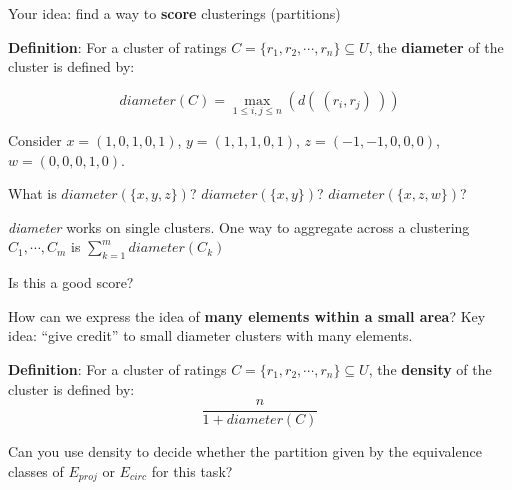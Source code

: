 Your idea: find a way to {\bf score} clusterings (partitions) 


{\bf Definition}: For a cluster of ratings $C = \{r_1, r_2, \cdots, r_n \} 
\subseteq U$, the {\bf diameter} of the cluster is defined by:

$$\textit{diameter}(C) = \max_{1 \leq i, j \leq n} (d(~(r_i, r_j)~))$$ 

Consider $x = (1, 0, 1, 0, 1)$, $y = (1, 1, 1, 0, 1)$, $z = (-1, -1, 0, 0, 0)$, $w = (0, 0, 0, 1, 0)$.

What is $\textit{diameter}(\{x, y, z\})$? $\textit{diameter}(\{x, y\})$? $\textit{diameter}(\{x, z, w\})$?

\vspace{100pt}

\textit{diameter} works on single clusters. One way to aggregate across a
clustering $C_1, \cdots, C_m$ is $\sum_{k=1}^m diameter(C_k)$


Is this a good score?

\vspace{100pt}

How can we express the idea of {\bf many elements within a small area}? Key idea: ``give credit'' to small diameter clusters with many elements.

{\bf Definition}: For a cluster of ratings $C = \{r_1, r_2, \cdots, r_n \} 
\subseteq U$, the {\bf density} of the cluster is defined by:
\[
    \frac{n}{1+ diameter(C)}
\]



\newpage

Can you use density to decide whether the partition given by 
the equivalence classes of $E_{proj}$ or $E_{circ}$ for this task?